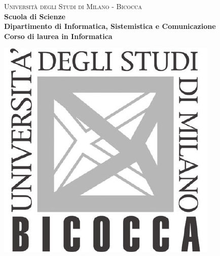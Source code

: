     \begin{titlepage}
        
        \centering
        
        \begin{minipage}[t]{1\textwidth}
        	\centering
        {
                {\LARGE\textsc{Università degli Studi di Milano - Bicocca}} \\
                \Large\textbf{Scuola di Scienze} \\
                \large\textbf{Dipartimento di Informatica, Sistemistica e Comunicazione} \\
                \textbf{Corso di laurea in Informatica} \\
                \par
        }
        \end{minipage}
        
        \centering
        \begin{minipage}[t]{\textwidth}
        	\vspace{10mm}
        \end{minipage}
         
        \centering
        \begin{minipage}[t]{1\textwidth}
       	\centering
        \includegraphics[scale=0.7]{img/logo-bicocca.pdf}
        \end{minipage}
        
        \begin{minipage}[t]{\textwidth}
        \end{minipage}
        

\end{titlepage}
